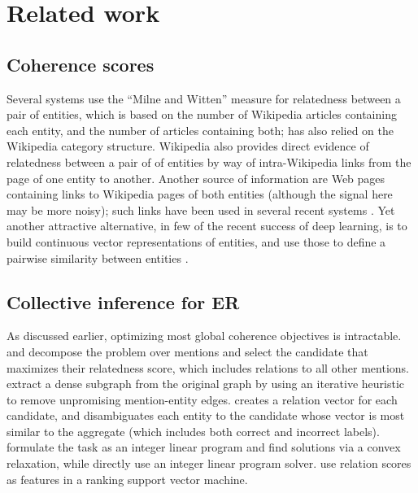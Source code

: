 \section{Related work}
\label{sec:related}

\subsection{Coherence scores}

Several systems \cite{Milne2008,KulkarniSRC09,Hoffart2011} use the ``Milne and Witten'' measure for relatedness between a pair of entities, which is based on the number of Wikipedia articles containing each entity, and the number of articles containing both;  has also relied on the Wikipedia category structure. %
Wikipedia also provides direct evidence of relatedness between a pair of of entities by way of intra-Wikipedia links from the page of one entity to another. Another source of information are Web pages containing links to Wikipedia pages of both entities (although the signal here may be more noisy); such links have been used in several recent systems \cite{ChengR13,Chisholm2015}.  Yet another attractive alternative, in few of the recent success of deep learning, is to build continuous vector representations of entities, and use those to define a pairwise similarity between entities \cite{YamadaS0T16}.


\subsection{Collective inference for ER}

As discussed earlier, optimizing most global coherence objectives is intractable.  and  decompose the problem over mentions and select the candidate that maximizes their relatedness score, which includes relations to all other mentions. %
 extract a dense subgraph from the original graph by using an iterative heuristic to remove unpromising mention-entity edges.  creates a relation vector for each candidate, and disambiguates each entity to the candidate whose vector is most similar to the aggregate (which includes both correct and incorrect labels).  formulate the task as an integer linear program and find solutions via a convex relaxation, while  directly use an integer linear program solver. 
 use relation scores as features in a ranking support vector machine.
 
